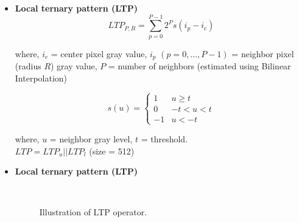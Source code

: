 \begin{frame}[t]{\subsubsecname}
	\topline
    \begin{itemize}
    	\item \textcolor{navy_theme}{\textbf{ Local ternary pattern (LTP) \cite{tan2010enhanced} }}
			\begin{equation}
				LTP_{P,R}=\sum_{p=0}^{P-1}2^{P}s(i_{p}-i_{c})
			\end{equation}

			where,
			$i_{c}$ = center pixel gray value,
			$i_{p}$ $(p = 0,..., P-1)$ = neighbor pixel (radius $R$) gray value,
			$P$ = number of neighbors (estimated using Bilinear Interpolation)

			\begin{equation}
				s(u)=\left\{\begin{matrix}
					1  & u \geq t   \\
					0  & -t < u < t \\
					-1 & u < -t
				\end{matrix}\right.
			\end{equation}

			where, $u$ = neighbor gray level, $t$ = threshold.\\$LTP=LTP_{u} || LTP_{l}$ (size = 512)

	\end{itemize}
\end{frame}

\begin{frame}[t]{\subsubsecname}
	\topline
    \begin{itemize}
    	\item \textcolor{navy_theme}{\textbf{ Local ternary pattern (LTP) \cite{tan2010enhanced}  }}

		\begin{figure}[!ht]
			\centering
			\scriptsize
				\hspace{2em}
			\\ 
				
					\hspace{2em}
			\caption{Illustration of LTP operator.}
			\label{fig:ltp}
		\end{figure}
	\end{itemize}
\end{frame}

